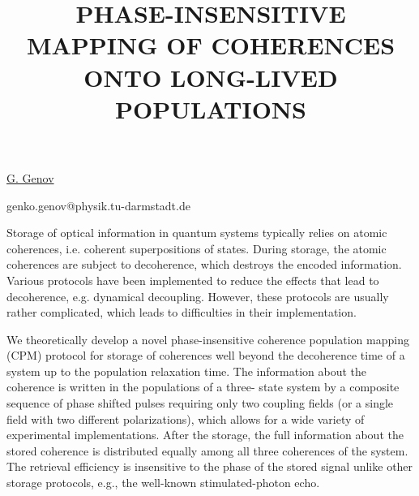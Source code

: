 \title{PHASE-INSENSITIVE MAPPING OF COHERENCES ONTO LONG-LIVED POPULATIONS}

\underline{G. Genov} 

{\normalsize{\vspace{-4mm}
\darmstadt

\email genko.genov@physik.tu-darmstadt.de}}

Storage of optical information in quantum systems typically relies on atomic coherences, i.e.
coherent superpositions of states. During storage, the atomic coherences are subject to
decoherence, which destroys the encoded information. Various protocols have been implemented to
reduce the effects that lead to decoherence, e.g. dynamical decoupling. However, these
protocols are usually rather complicated, which leads to difficulties in their implementation.

We theoretically develop a novel phase-insensitive coherence population mapping (CPM) protocol
for storage of coherences well beyond the decoherence time of a system up to the population
relaxation time. The information about the coherence is written in the populations of a three-
state system by a composite sequence of phase shifted pulses requiring only two coupling fields
(or a single field with two different polarizations), which allows for a wide variety of
experimental implementations. After the storage, the full information about the stored
coherence is distributed equally among all three coherences of the system. The retrieval
efficiency is insensitive to the phase of the stored signal unlike other storage protocols,
e.g., the well-known stimulated-photon echo.

\vspace{\baselineskip}
